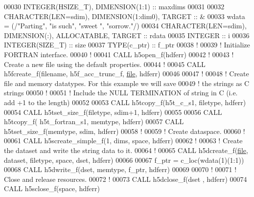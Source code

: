 \begin{DoxyCode}
00030   \textcolor{keywordtype}{INTEGER(HSIZE\_T)}, \textcolor{keywordtype}{DIMENSION(1:1)} :: maxdims
00031 
00032   \textcolor{keywordtype}{CHARACTER(LEN=sdim)}, \textcolor{keywordtype}{DIMENSION(1:dim0)}, \textcolor{keywordtype}{TARGET} :: &
00033        wdata = (/\textcolor{stringliteral}{"Parting"}, \textcolor{stringliteral}{"is such"}, \textcolor{stringliteral}{"sweet  "}, \textcolor{stringliteral}{"sorrow."}/)
00034   \textcolor{keywordtype}{CHARACTER(LEN=sdim)}, \textcolor{keywordtype}{DIMENSION(:)}, \textcolor{keywordtype}{ALLOCATABLE}, \textcolor{keywordtype}{TARGET} :: rdata
00035   \textcolor{keywordtype}{INTEGER} :: i
00036   \textcolor{keywordtype}{INTEGER(SIZE\_T)} :: size
00037   \textcolor{keywordtype}{TYPE}(c\_ptr) :: f\_ptr
00038   \textcolor{comment}{!}
00039   \textcolor{comment}{! Initialize FORTRAN interface.}
00040   \textcolor{comment}{!}
00041   \textcolor{keyword}{CALL }h5open\_f(hdferr)
00042   \textcolor{comment}{!}
00043   \textcolor{comment}{! Create a new file using the default properties.}
00044   \textcolor{comment}{!}
00045   \textcolor{keyword}{CALL }h5fcreate\_f(filename, h5f\_acc\_trunc\_f, \hyperlink{structfile}{file}, hdferr)
00046 
00047   \textcolor{comment}{!}
00048   \textcolor{comment}{! Create file and memory datatypes.  For this example we will save}
00049   \textcolor{comment}{! the strings as C strings}
00050   \textcolor{comment}{!}
00051   \textcolor{comment}{! Include the NULL TERMINATION of string in C (i.e. add +1 to the length)}
00052 
00053   \textcolor{keyword}{CALL }h5tcopy\_f(h5t\_c\_s1, filetype, hdferr)
00054   \textcolor{keyword}{CALL }h5tset\_size\_f(filetype, sdim+1, hdferr)
00055 
00056   \textcolor{keyword}{CALL }h5tcopy\_f( h5t\_fortran\_s1, memtype, hdferr)
00057   \textcolor{keyword}{CALL }h5tset\_size\_f(memtype, sdim, hdferr)
00058   \textcolor{comment}{!}
00059   \textcolor{comment}{! Create dataspace.}
00060   \textcolor{comment}{!}
00061   \textcolor{keyword}{CALL }h5screate\_simple\_f(1, dims, space, hdferr)
00062   \textcolor{comment}{!}
00063   \textcolor{comment}{! Create the dataset and write the string data to it.}
00064   \textcolor{comment}{!}
00065   \textcolor{keyword}{CALL }h5dcreate\_f(\hyperlink{structfile}{file}, dataset, filetype, space, dset, hdferr)
00066 
00067   f\_ptr = c\_loc(wdata(1)(1:1))
00068   \textcolor{keyword}{CALL }h5dwrite\_f(dset, memtype, f\_ptr, hdferr)
00069 
00070   \textcolor{comment}{!}
00071   \textcolor{comment}{! Close and release resources.}
00072   \textcolor{comment}{!}
00073   \textcolor{keyword}{CALL }h5dclose\_f(dset , hdferr)
00074   \textcolor{keyword}{CALL }h5sclose\_f(space, hdferr)

\end{DoxyCode}
